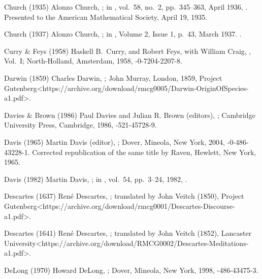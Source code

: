 \biblabel Church (1935)
Alonzo Church,
;
in ,
vol.\ 58, no.\ 2, pp.\ 345--363, April 1936,
.
Presented to the American Mathematical Society,
April 19, 1935.

\biblabel Church (1937)
Alonzo Church,
;
in ,
Volume 2, Issue 1, p.~43, March 1937.
.

\biblabel Curry \& Feys (1958)
Haskell B.\ Curry, and
Robert Feys, with
William  Craig,
, Vol.\ I;
North-Holland, Amsterdam, 1958,
-0-7204-2207-8.

\biblabel Darwin (1859)
Charles Darwin,
;
John Murray, London, 1859,
\URL Project Gutenberg<https://archive.org/download/rmcg0005/Darwin-OriginOfSpecies-a1.pdf>.

\biblabel Davies \& Brown (1986)
Paul Davies and Julian R. Brown (editors),
;
Cambridge University Press, Cambridge, 1986,
-521-45728-9.

\biblabel Davis (1965)
Martin Davis (editor),
;
Dover, Mineola, New York, 2004,
-0-486-43228-1.
Corrected republication of the same title
by Raven, Hewlett, New York, 1965.

\biblabel Davis (1982)
Martin Davis,
;
in ,
vol.\ 54, pp.\ 3--24, 1982,
.

\biblabel Descartes (1637)
René Descartes,
;
translated by John Veitch (1850),
\URL Project Gutenberg<https://archive.org/download/rmcg0001/Descartes-Discourse-a1.pdf>.

\biblabel Descartes (1641)
René Descartes,
;
translated by John Veitch (1852),
\URL Lancaster University<https://archive.org/download/RMCG0002/Descartes-Meditations-a1.pdf>.

\biblabel DeLong (1970)
Howard DeLong,
;
Dover, Mineola, New York, 1998,
-486-43475-3.

